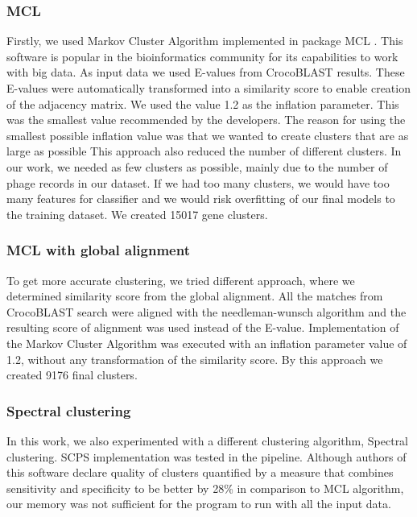 \subsubsection{MCL}
Firstly, we used Markov Cluster Algorithm implemented in package MCL \cite{mcl}.
This software is popular in the bioinformatics community for its capabilities to work with big data.
As input data we used E-values from CrocoBLAST results.
These E-values were automatically transformed into a similarity score to enable creation of the adjacency matrix.
We used the value 1.2 as the inflation parameter.
This was the smallest value recommended by the developers.
The reason for using the smallest possible inflation value was that we wanted to create clusters that are as large as possible
This approach also reduced the number of different clusters.
In our work, we needed as few clusters as possible, mainly due to the number of phage records in our dataset.
If we had too many clusters, we would have too many features for classifier and we would risk overfitting of our final models to the training dataset.
We created 15017 gene clusters.

\subsubsection{MCL with global alignment}
To get more accurate clustering, we tried different approach, where we determined similarity score from the global alignment.
All the matches from CrocoBLAST search were aligned with the needleman-wunsch algorithm \cite{needleman-wunsch} and the resulting score of alignment was used instead of the E-value.
Implementation of the Markov Cluster Algorithm was executed with an inflation parameter value of 1.2, without any transformation of the similarity score.
By this approach we created 9176 final clusters.

\subsubsection{Spectral clustering}
In this work, we also experimented with a different clustering algorithm, Spectral clustering.
SCPS implementation\cite{scps} was tested in the pipeline.
Although authors of this software declare quality of clusters quantified by a measure that combines sensitivity and specificity to be better by 28\% in comparison to MCL algorithm, our memory was not sufficient for the program to run with all the input data.